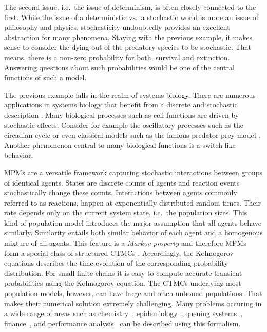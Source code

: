The second issue, i.e.\ the issue of determinism, is often closely
connected to the first.
While the issue of a deterministic vs.\ a stochastic world is more an
issue of philosophy and physics, stochasticity undoubtedly provides
an excellent abstraction for many phenomena.
Staying with the previous example, it makes sense to consider the
dying out of the predatory species to be stochastic.
That means, there is a non-zero probability for both, survival and extinction.
Answering questions about such probabilities would be one of the
central functions of such a model.

The previous example falls in the realm of systems biology.
There are numerous applications in systems biology that benefit from
a discrete and stochastic description
\parencite{wilkinson2018stochastic,BuchWolkenhauer}.
Many biological processes such as cell functions are driven by
stochastic effects.
Consider for example the oscillatory processes such as the circadian
cycle \parencite{asgari2019mathematical} or even classical models
such as the famous predator-prey model \parencite{lotka1925elements}.
Another phenomenon central to many biological functions is a
switch-like behavior.

\Acfp{MPM} are a versatile framework capturing stochastic
interactions between groups of identical agents.
States are discrete counts of agents and reaction events
stochastically change these counts.
Interactions between agents commonly referred to as reactions, happen
at exponentially distributed random times.
Their rate depends only on the current system state, i.e.\ the population sizes.
This kind of population model introduces the major assumption that
all agents behave similarly.
Similarity entails both similar behavior of each agent and a
homogenous mixture of all agents.
This feature is a \emph{Markov property} and
therefore \acp{MPM} form a special class of structured \acp{CTMC}
\parencite{anderson2012continuous}.
Accordingly, the Kolmogorov equations describes the time-evolution of
the corresponding probability distribution.
For small finite chains it is easy to compute accurate transient
probabilities using the Kolmogorov equation.
The \acp{CTMC} underlying most population models, however, can have
large and often unbound populations.
That makes their numerical solution extremely challenging.
Many problems occuring in a wide range of areas such as
chemistry~\parencite{gillespie1977exact},
epidemiology~\parencite{mode2000stochastic},    queuing
systems~\parencite{breuer2003markov},
finance~\parencite{pardoux2008markov}, and performance
analysis~\parencite{bortolussi2013continuous,gast2019} can be
described using this formalism.

